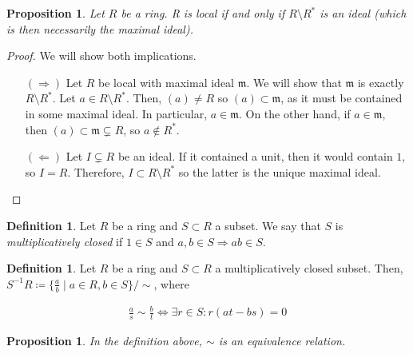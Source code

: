 \documentclass[11pt]{article}
\newtheorem{prop}[theorem]{Proposition}
\theoremstyle{definition}
\newtheorem{defn}[theorem]{Definition}
\begin{document}
        \begin{prop} \label{prop:local}
            Let $R$ be a ring.
            R is local if and only if $R \setminus R^*$ is an ideal (which is then necessarily the maximal ideal).
        \end{prop}

            \begin{proof}
            We will show both implications.
                \begin{itemize}
                    \item[$(\Rightarrow)$] Let $R$ be local with maximal ideal $\mathfrak{m}$.
                    We will show that $\mathfrak{m}$ is exactly $R \setminus R^*$.
                    Let $a \in R \setminus R^*$.
                    Then, $(a) \neq R$ so $(a) \subset \mathfrak{m}$, as it must be contained in some maximal ideal.
                    In particular, $a \in \mathfrak{m}$.
                    On the other hand,
                    if $a \in \mathfrak{m}$, then $(a) \subset \mathfrak{m} \subsetneq R$, so $a \notin R^*$.

                    \item[$(\Leftarrow)$] Let $I \subsetneq R$ be an ideal.
                    If it contained a unit, then it would contain $1$, so $I = R$.
                    Therefore, $I \subset R \setminus R^*$ so the latter is the unique maximal ideal.
                \end{itemize}
            \end{proof}

        \begin{defn}
            Let $R$ be a ring and $S \subset R$ a subset.
            We say that $S$ is \emph{multiplicatively closed} if $1 \in S$ and $a, b \in S \Rightarrow ab \in S$.
        \end{defn}

        \begin{defn}
            Let $R$ be a ring and $S \subset R$ a multiplicatively closed subset.
            Then, $S^{-1}R \coloneqq \{\frac{a}{b} \mid a \in R, b \in S\}/\sim$,
            where

            \begin{align}
                \frac{a}{s} \sim \frac{b}{t}  \Leftrightarrow \exists r \in S \colon  r (at - bs) = 0
            \end{align}
        \end{defn}

        \begin{prop}
            In the definition above, $\sim$ is an equivalence relation.
        \end{prop}
\end{document}
